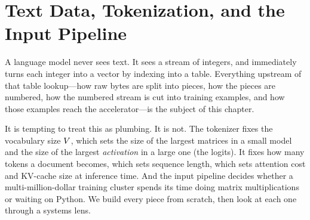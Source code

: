 \chapter{Text Data, Tokenization, and the Input Pipeline}\label{ch:text}

A language model never sees text. It sees a stream of integers, and immediately turns each
integer into a vector by indexing into a table. Everything upstream of that table lookup---how
raw bytes are split into pieces, how the pieces are numbered, how the numbered stream is cut into
training examples, and how those examples reach the accelerator---is the subject of this chapter.

It is tempting to treat this as plumbing. It is not. The tokenizer fixes the vocabulary size
$V$, which sets the size of the largest matrices in a small model and the size of the
largest \emph{activation} in a large one (the logits). It fixes how many tokens a document becomes,
which sets sequence length, which sets attention cost and KV-cache size at inference time. And the
input pipeline decides whether a multi-million-dollar training cluster spends its time doing matrix
multiplications or waiting on Python. We build every piece from scratch, then look at each one
through a systems lens.

